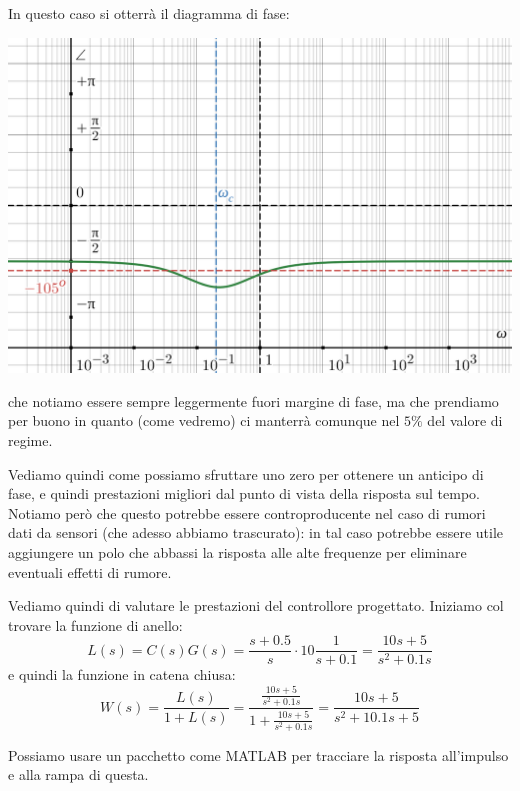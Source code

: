 \documentclass[a4paper,11pt]{article}
\begin{document}
\begin{itemize}
\begin{minipage}{\textwidth}
		In questo caso si otterrà il diagramma di fase:
		\begin{center}
			\includegraphics[scale=0.28]{../figures/crociera_phi_good.png}
		\end{center}
		che notiamo essere sempre leggermente fuori margine di fase, ma che prendiamo per buono in quanto (come vedremo) ci manterrà comunque nel $5\%$ del valore di regime.

		\end{minipage}

	Vediamo quindi come possiamo sfruttare uno zero per ottenere un anticipo di fase, e quindi prestazioni migliori dal punto di vista della risposta sul tempo.
	Notiamo però che questo potrebbe essere controproducente nel caso di rumori dati da sensori (che adesso abbiamo trascurato): in tal caso potrebbe essere utile aggiungere un polo che abbassi la risposta alle alte frequenze per eliminare eventuali effetti di rumore.
\end{itemize}

Vediamo quindi di valutare le prestazioni del controllore progettato.
Iniziamo col trovare la funzione di anello:
$$
L(s) = C(s) G(s) = \frac{s + 0.5}{s} \cdot 10 \frac{1}{s + 0.1} = \frac{10 s + 5}{s^2 + 0.1 s}
$$
e quindi la funzione in catena chiusa:
$$
W(s) = \frac{L(s)}{1 + L(s)} = \frac{\frac{10 s + 5}{s^2 + 0.1 s}}{1 + \frac{10 s + 5}{s^2 + 0.1 s}} = \frac{10 s + 5}{s^2 + 10.1 s + 5}
$$

Possiamo usare un pacchetto come MATLAB per tracciare la risposta all'impulso e alla rampa di questa.
\end{document}

